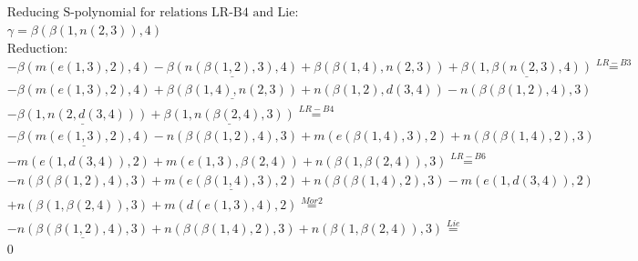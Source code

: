 \documentclass[11pt]{amsart}
\begin{document}
\begin{align*} 
& \text{Reducing S-polynomial for relations LR-B4 and Lie:} \\ 
& \gamma = \beta(\beta(1,n(2,3)),4) \\ 
& \text{Reduction}: \\& - \beta(m(e(1,3),2),4) - \underline{\beta(n(\beta(1,2),3),4)} + \beta(\beta(1,4),n(2,3)) + \underline{\beta(1,\beta(n(2,3),4))} \stackrel{ LR-B3 }{=}  \\ 
& - \beta(m(e(1,3),2),4) + \underline{\beta(\beta(1,4),n(2,3))} + n(\beta(1,2),d(3,4)) - n(\beta(\beta(1,2),4),3)\\ 
 &  - \underline{\beta(1,n(2,d(3,4)))} + \underline{\beta(1,n(\beta(2,4),3))} \stackrel{ LR-B4 }{=}  \\ 
& - \underline{\beta(m(e(1,3),2),4)} - n(\beta(\beta(1,2),4),3) + m(e(\beta(1,4),3),2) + n(\beta(\beta(1,4),2),3)\\ 
 &  - m(e(1,d(3,4)),2) + m(e(1,3),\beta(2,4)) + n(\beta(1,\beta(2,4)),3) \stackrel{ LR-B6 }{=}  \\ 
& - n(\beta(\beta(1,2),4),3) + \underline{m(e(\beta(1,4),3),2)} + n(\beta(\beta(1,4),2),3) - m(e(1,d(3,4)),2)\\ 
 &  + n(\beta(1,\beta(2,4)),3) + m(d(e(1,3),4),2) \stackrel{ Mor2 }{=}  \\ 
& - \underline{n(\beta(\beta(1,2),4),3)} + n(\beta(\beta(1,4),2),3) + n(\beta(1,\beta(2,4)),3) \stackrel{ Lie }{=}  \\ 
&0\\ 
\end{align*} 
 
\end{document}
